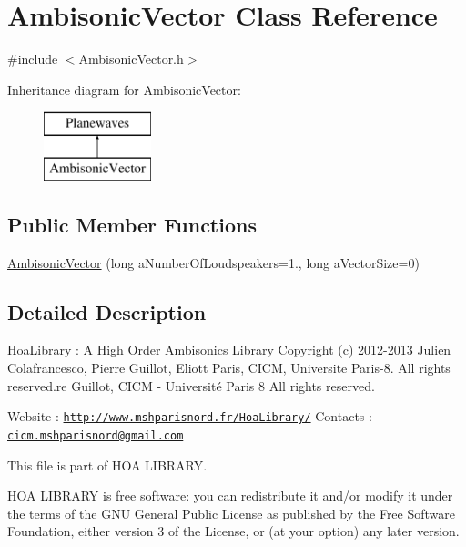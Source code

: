 \hypertarget{class_ambisonic_vector}{\section{Ambisonic\-Vector Class Reference}
\label{class_ambisonic_vector}
}


{\ttfamily \#include $<$Ambisonic\-Vector.\-h$>$}

Inheritance diagram for Ambisonic\-Vector\-:\begin{figure}[H]
\begin{center}
\leavevmode
\includegraphics[height=2.000000cm]{class_ambisonic_vector}
\end{center}
\end{figure}
\subsection*{Public Member Functions}
\begin{DoxyCompactItemize}
\item 
\hyperlink{class_ambisonic_vector_ae4c02b111015ca551b50676e9989e5e1}{Ambisonic\-Vector} (long a\-Number\-Of\-Loudspeakers=1., long a\-Vector\-Size=0)
\end{DoxyCompactItemize}


\subsection{Detailed Description}
Hoa\-Library \-: A High Order Ambisonics Library Copyright (c) 2012-\/2013 Julien Colafrancesco, Pierre Guillot, Eliott Paris, C\-I\-C\-M, Universite Paris-\/8. All rights reserved.\-re Guillot, C\-I\-C\-M -\/ Université Paris 8 All rights reserved.

Website \-: \href{http://www.mshparisnord.fr/HoaLibrary/}{\tt http\-://www.\-mshparisnord.\-fr/\-Hoa\-Library/} Contacts \-: \href{mailto:cicm.mshparisnord@gmail.com}{\tt cicm.\-mshparisnord@gmail.\-com}

This file is part of H\-O\-A L\-I\-B\-R\-A\-R\-Y.

H\-O\-A L\-I\-B\-R\-A\-R\-Y is free software\-: you can redistribute it and/or modify it under the terms of the G\-N\-U General Public License as published by the Free Software Foundation, either version 3 of the License, or (at your option) any later version.

